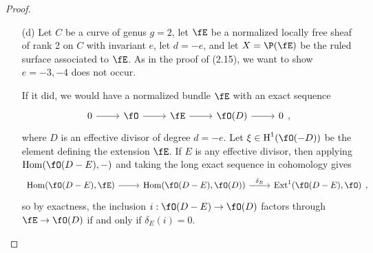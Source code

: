 \documentclass[a4paper]{article}
\begin{document}
\begin{enumerate} [label=\textbf{\arabic*.}, leftmargin=0em]
\begin{proof}
\begin{itemize} [leftmargin=0cm]
                        Now, consider the subset $B \subset C^{(d - 1)} \times |H|$ consisting of all pairs $\langle E, H \rangle$ such that $E \in C^{(d - 1)}$ is a closed point and $H \in B_E$.
                        Clearly $B$ is the set of closed points of a $C^{(d - 1)} \times |H|$, which we denote also by $B$, and which we give a reduced induced scheme structure.
                        The first projection $p_1 : B \to C^{(d - 1)}$ is surjective, with fibre a projective space of dimension $d - 2$.
                        So $B$ has dimension $(d - 1) + (d - 2) = 2d - 3$, which is strictly smaller than $\dim |H| = g + d - 2$.
                        If $H \in |H| - p_2(B)$, then $H \nsupseteq L_E$ for every $E \in C^{(d - 1)}$, so the extension of $\fO(D)$ by $\fO$ given by the element in $\cH^0(\fO(K + D)) \cong \cH^1(\fO(-D))$ corresponding to $H$ satisfies the requirement of (b).
                        Hence, if $-g \leq e < 0$, then there exists a ruled surface $X$ over $C$ with invariant $e$.

                  \item[(d)] Let $C$ be a curve of genus $g = 2$, let $\fE$ be a normalized locally free sheaf of rank 2 on $C$ with invariant $e$, let $d = -e$, and let $X = \P(\fE)$ be the ruled surface associated to $\fE$.
                        As in the proof of (2.15), we want to show $e = -3, -4$ does not occur.

                        If it did, we would have a normalized bundle $\fE$ with an exact sequence
                        \[ \begin{tikzcd}
                                0 \arrow[r] & \fO \arrow[r] & \fE \arrow[r] & \fO(D) \arrow[r] & 0
                            \end{tikzcd}, \]
                        where $D$ is an effective divisor of degree $d = -e$.
                        Let $\xi \in \cH^1(\fO(-D))$ be the element defining the extension $\fE$.
                        If $E$ is any effective divisor, then applying $\Hom(\fO(D - E), -)$ and taking the long exact sequence in cohomology gives
                        \[ \begin{tikzcd}
                                \Hom(\fO(D - E), \fE) \arrow[r] & \Hom(\fO(D - E), \fO(D)) \arrow[r, "\delta_E"] & \Ext^1(\fO(D - E), \fO)
                            \end{tikzcd}, \]
                        so by exactness, the inclusion $i : \fO(D - E) \to \fO(D)$ factors through $\fE \to \fO(D)$ if and only if $\delta_E(i) = 0$.


\end{itemize}
\end{proof}
\end{enumerate}
\end{document}
